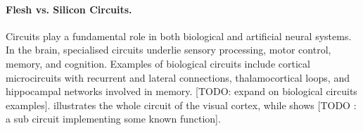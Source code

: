 
\paragraph{Flesh vs. Silicon Circuits.}
Circuits play a fundamental role in both biological and artificial neural systems. In the brain, specialised circuits underlie sensory processing, motor control, memory, and cognition. Examples of biological circuits include cortical microcircuits with recurrent and lateral connections, thalamocortical loops, and hippocampal networks involved in memory. [TODO: expand on biological circuits examples].  illustrates the whole circuit of the visual cortex, while  shows [TODO : a sub circuit implementing some known function].

